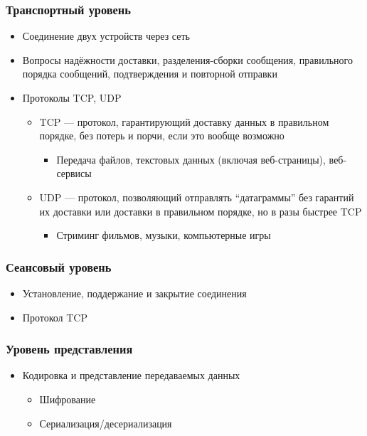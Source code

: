 \documentclass[xetex,mathserif,serif]{beamer}
\begin{document}
	\begin{frame}
		\frametitle{Транспортный уровень}
		\begin{itemize}
			\item Соединение двух устройств через сеть
			\item Вопросы надёжности доставки, разделения-сборки сообщения, правильного порядка сообщений, подтверждения и повторной отправки
			\item Протоколы TCP, UDP
			\begin{itemize}
				\item TCP --- протокол, гарантирующий доставку данных в правильном порядке, без потерь и порчи, если это вообще возможно
				\begin{itemize}
					\item Передача файлов, текстовых данных (включая веб-страницы), веб-сервисы
				\end{itemize}
				\item UDP --- протокол, позволяющий отправлять ``датаграммы'' без гарантий их доставки или доставки в правильном порядке, но в разы быстрее TCP
				\begin{itemize}
					\item Стриминг фильмов, музыки, компьютерные игры
				\end{itemize}
			\end{itemize}
		\end{itemize}
	\end{frame}

	\begin{frame}
		\frametitle{Сеансовый уровень}
		\begin{itemize}
			\item Установление, поддержание и закрытие соединения
			\item Протокол TCP
		\end{itemize}
	\end{frame}

	\begin{frame}
		\frametitle{Уровень представления}
		\begin{itemize}
			\item Кодировка и представление передаваемых данных
			\begin{itemize}
				\item Шифрование
				\item Сериализация/десериализация
			\end{itemize}
		\end{itemize}
	\end{frame}
\end{document}
